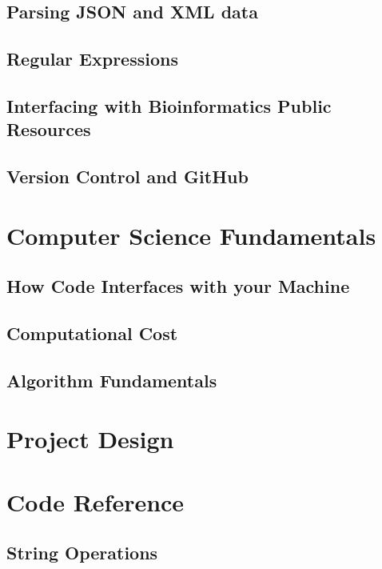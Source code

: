 \documentclass[a4paper,11pt]{article}
\begin{document}
\pagebreak
\subsection{Parsing JSON and XML data}

\pagebreak
\subsection{Regular Expressions}

\pagebreak
\subsection{Interfacing with Bioinformatics Public Resources}

\pagebreak
\subsection{Version Control and GitHub}

\pagebreak
\section{Computer Science Fundamentals}
\subsection{How Code Interfaces with your Machine}

\pagebreak
\subsection{Computational Cost}

\pagebreak
\subsection{Algorithm Fundamentals}

\pagebreak
\section{Project Design}

\pagebreak
\section{Code Reference}
\subsection{String Operations}
\end{document}
